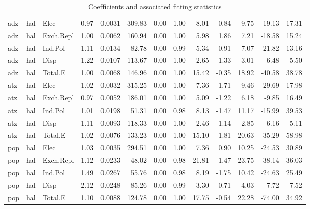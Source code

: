 \begin{table}[ht]
\begin{tabular}{lllrrrrrrrrrr}
  adz & hal & Elec & 0.97 & 0.0031 & 309.83 & 0.00 & 1.00 & 8.01 & 0.84 & 9.75 & -19.13 & 17.31 \\ 
  adz & hal & Exch.Repl & 1.00 & 0.0062 & 160.94 & 0.00 & 1.00 & 5.98 & 1.86 & 7.21 & -18.58 & 15.24 \\ 
  adz & hal & Ind.Pol & 1.11 & 0.0134 & 82.78 & 0.00 & 0.99 & 5.34 & 0.91 & 7.07 & -21.82 & 13.16 \\ 
  adz & hal & Disp & 1.22 & 0.0107 & 113.67 & 0.00 & 1.00 & 2.65 & -1.33 & 3.01 & -6.48 & 5.50 \\ 
  adz & hal & Total.E & 1.00 & 0.0068 & 146.96 & 0.00 & 1.00 & 15.42 & -0.35 & 18.92 & -40.58 & 38.78 \\ 
  atz & hal & Elec & 1.02 & 0.0032 & 315.25 & 0.00 & 1.00 & 7.36 & 1.71 & 9.46 & -29.69 & 17.98 \\ 
  atz & hal & Exch.Repl & 0.97 & 0.0052 & 186.01 & 0.00 & 1.00 & 5.09 & -1.22 & 6.18 & -9.85 & 16.49 \\ 
  atz & hal & Ind.Pol & 1.01 & 0.0198 & 51.31 & 0.00 & 0.98 & 8.13 & -1.47 & 11.17 & -15.99 & 39.53 \\ 
  atz & hal & Disp & 1.11 & 0.0093 & 118.33 & 0.00 & 1.00 & 2.46 & -1.14 & 2.85 & -6.16 & 5.11 \\ 
  atz & hal & Total.E & 1.02 & 0.0076 & 133.23 & 0.00 & 1.00 & 15.10 & -1.81 & 20.63 & -35.29 & 58.98 \\ 
  pop & hal & Elec & 1.03 & 0.0035 & 294.51 & 0.00 & 1.00 & 7.36 & 0.90 & 10.25 & -24.53 & 30.89 \\ 
  pop & hal & Exch.Repl & 1.12 & 0.0233 & 48.02 & 0.00 & 0.98 & 21.81 & 1.47 & 23.75 & -38.14 & 36.03 \\ 
  pop & hal & Ind.Pol & 1.49 & 0.0267 & 55.76 & 0.00 & 0.98 & 8.19 & -1.75 & 10.42 & -24.63 & 25.49 \\ 
  pop & hal & Disp & 2.12 & 0.0248 & 85.26 & 0.00 & 0.99 & 3.30 & -0.71 & 4.03 & -7.72 & 7.52 \\ 
  pop & hal & Total.E & 1.10 & 0.0088 & 124.78 & 0.00 & 1.00 & 17.75 & -0.54 & 22.28 & -74.00 & 34.92 \\ 
   \hline
\end{tabular}
    \caption{Coefficients and associated fitting statistics \label{tab:coef_indiv}}
\end{table}


